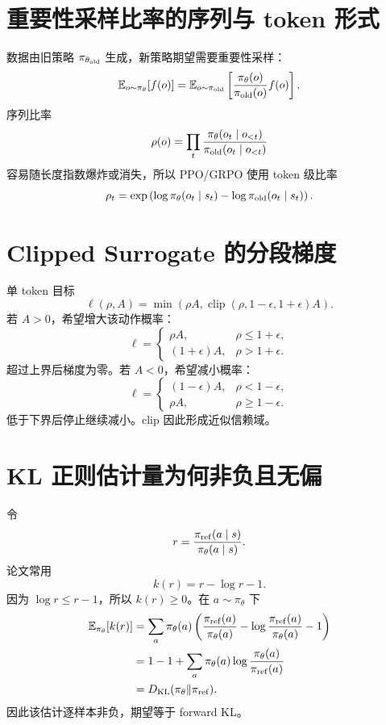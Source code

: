 \documentclass[UTF8,12pt,a4paper,fontset=none]{ctexart}
\numberwithin{equation}{section}
\newcommand{\E}{\mathbb{E}}
\newcommand{\KL}{D_{\mathrm{KL}}}
\begin{document}
\section{重要性采样比率的序列与 token 形式}
数据由旧策略 $\pi_{\theta_{\rm old}}$ 生成，新策略期望需要重要性采样：
\begin{equation}
 \E_{o\sim\pi_\theta}[f(o)]
 =\E_{o\sim\pi_{\rm old}}
 \left[\frac{\pi_\theta(o)}{\pi_{\rm old}(o)}f(o)\right].
\end{equation}
序列比率
\begin{equation}
 \rho(o)=\prod_t
 \frac{\pi_\theta(o_t\mid o_{<t})}
 {\pi_{\rm old}(o_t\mid o_{<t})}
\end{equation}
容易随长度指数爆炸或消失，所以 PPO/GRPO 使用 token 级比率
\begin{equation}
 \rho_t=\exp\left(
 \log\pi_\theta(o_t\mid s_t)-
 \log\pi_{\rm old}(o_t\mid s_t)
 \right).
\end{equation}

\section{Clipped Surrogate 的分段梯度}
单 token 目标
\begin{equation}
 \ell(\rho,A)=
 \min\left(\rho A,
 \operatorname{clip}(\rho,1-\epsilon,1+\epsilon)A\right).
\end{equation}
若 $A>0$，希望增大该动作概率：
\begin{equation}
 \ell=\begin{cases}
 \rho A,&\rho\le1+\epsilon,\\
 (1+\epsilon)A,&\rho>1+\epsilon.
 \end{cases}
\end{equation}
超过上界后梯度为零。若 $A<0$，希望减小概率：
\begin{equation}
 \ell=\begin{cases}
 (1-\epsilon)A,&\rho<1-\epsilon,\\
 \rho A,&\rho\ge1-\epsilon.
 \end{cases}
\end{equation}
低于下界后停止继续减小。clip 因此形成近似信赖域。

\section{KL 正则估计量为何非负且无偏}
令
\begin{equation}
 r=\frac{\pi_{\rm ref}(a\mid s)}{\pi_\theta(a\mid s)}.
\end{equation}
论文常用
\begin{equation}
 k(r)=r-\log r-1.
\end{equation}
因为 $\log r\le r-1$，所以 $k(r)\ge0$。在 $a\sim\pi_\theta$ 下
\begin{align}
 \E_{\pi_\theta}[k(r)]
 &=\sum_a\pi_\theta(a)
 \left(\frac{\pi_{\rm ref}(a)}{\pi_\theta(a)}
 -\log\frac{\pi_{\rm ref}(a)}{\pi_\theta(a)}-1\right)\\
 &=1-1+\sum_a\pi_\theta(a)
 \log\frac{\pi_\theta(a)}{\pi_{\rm ref}(a)}\\
 &=\KL(\pi_\theta\|\pi_{\rm ref}).
\end{align}
因此该估计逐样本非负，期望等于 forward KL。
\end{document}

